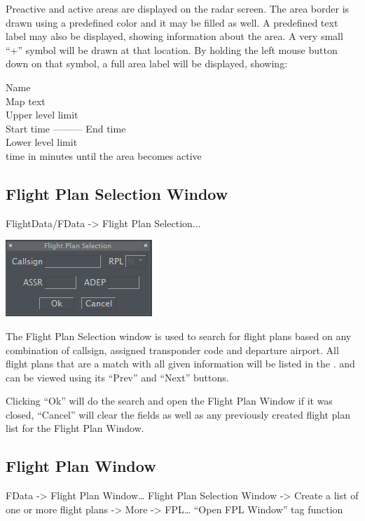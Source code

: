 \documentclass[11pt,a4paper]{memoir}
\begin{document}
Preactive and active areas are displayed on the radar screen. The area border is drawn using a predefined color and it may be filled as well. A predefined text label may also be displayed, showing information about the area. A very small “+” symbol will be drawn at that location. By holding the left mouse button down on that symbol, a full area label will be displayed, showing:

\begin{center}
        Name\\ 
        Map text\\
        Upper level limit\\
        Start time --------- End time\\
        Lower level limit\\time in minutes until the area becomes active
\end{center}

\subsection{Flight Plan Selection Window}
\label{win:fpsw}

\textit{} FlightData/FData -> Flight Plan Selection...

\includegraphics{img/fpsel.png}

The Flight Plan Selection window is used to search for flight plans based on any combination of callsign, assigned transponder code and departure airport. All flight plans that are a match with all given information will be listed in the \textit{}. and can be viewed using its “Prev” and “Next” buttons.

Clicking “Ok” will do the search and open the Flight Plan Window if it was closed, “Cancel” will clear the fields as well as any previously created flight plan list for the Flight Plan Window.

\subsection{Flight Plan Window}
\label{win:fpw}

\textit{} FData -> Flight Plan Window… 
Flight Plan Selection Window -> Create a list of one or more flight plans 
\textit{} -> More -> FPL… 
“Open FPL Window” tag function
\end{document}
